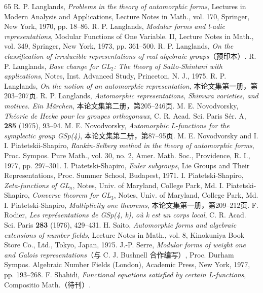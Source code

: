 \begin{thebibliography}{65}
 R. P. Langlands, \emph{Problems in the theory of automorphic forms}, Lectures in Modern Analysis and Applications, Lecture Notes in Math., vol. 170, Springer, New York, 1970, pp. 18--86.
 R. P. Langlands, \emph{Modular forms and l-adic representations}, Modular Functions of One Variable. II, Lecture Notes in Math., vol. 349, Springer, New York, 1973, pp. 361--500.
 R. P. Langlands, \emph{On the classification of irreducible representations of real algebraic groups}（预印本）.
 R. P. Langlands, \emph{Base change for GL$_2$: The theory of Saito-Shintani with applications}, Notes, Inst. Advanced Study, Princeton, N. J., 1975.
 R. P. Langlands, \emph{On the notion of an automorphic representation}, 本论文集第一册，第203--207页.
 R. P. Langlands, \emph{Automorphic representations, Shimura varieties, and motives. Ein Märchen}, 本论文集第二册，第205--246页.
 M. E. Novodvorsky, \emph{Théorie de Hecke pour les groupes orthogonaux}, C. R. Acad. Sci. Paris Sér. A, \textbf{285} (1975), 93--94.
 M. E. Novodvorsky, \emph{Automorphic L-functions for the symplectic group GSp(4)}, 本论文集第二册，第87--95页.
 M. E. Novodvorsky and I. I. Piatetskii-Shapiro, \emph{Rankin-Selberg method in the theory of automorphic forms}, Proc. Sympos. Pure Math., vol. 30, no. 2, Amer. Math. Soc., Providence, R. I., 1977, pp. 297--301.
 I. Piatetski-Shapiro, \emph{Euler subgroups}, Lie Groups and Their Representations, Proc. Summer School, Budapest, 1971.
 I. Piatetski-Shapiro, \emph{Zeta-functions of GL$_n$}, Notes, Univ. of Maryland, College Park, Md.
 I. Piatetski-Shapiro, \emph{Converse theorem for GL$_3$}, Notes, Univ. of Maryland, College Park, Md.
 I. Piatetski-Shapiro, \emph{Multiplicity one theorems}, 本论文集第一册，第209--212页.
 F. Rodier, \emph{Les représentations de GSp(4, k), où k est un corps local}, C. R. Acad. Sci. Paris \textbf{283} (1976), 429--431.
 H. Saito, \emph{Automorphic forms and algebraic extensions of number fields}, Lecture Notes in Math., vol. 8, Kinokuniya Book Store Co., Ltd., Tokyo, Japan, 1975.
 J.-P. Serre, \emph{Modular forms of weight one and Galois representations}（与 C. J. Bushnell 合作编写）, Proc. Durham Sympos. Algebraic Number Fields (London), Academic Press, New York, 1977, pp. 193--268.
 F. Shahidi, \emph{Functional equations satisfied by certain L-functions}, Compositio Math.（待刊）.

\end{thebibliography}
